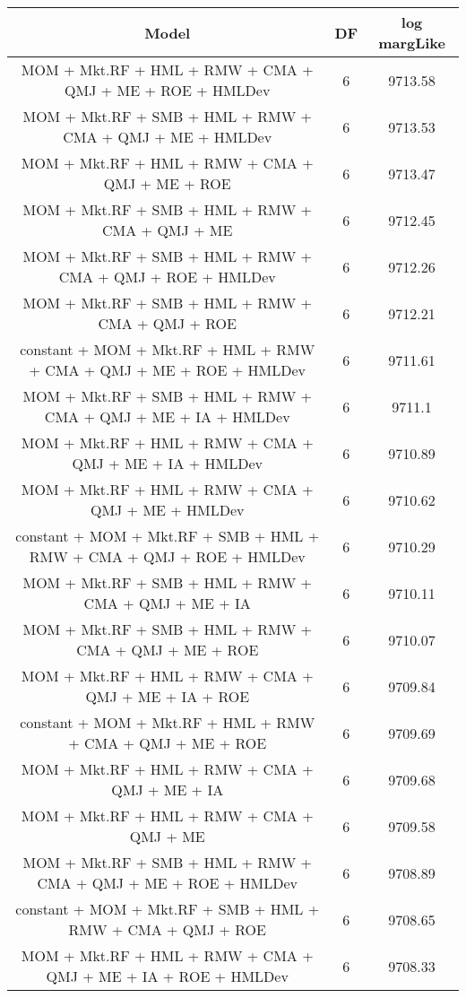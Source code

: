 \begin{tabular}{ccc}
  \hline
Model & DF & log margLike \\ 
  \hline
MOM + Mkt.RF + HML + RMW + CMA + QMJ + ME + ROE + HMLDev & 6 & 9713.58 \\ 
  MOM + Mkt.RF + SMB + HML + RMW + CMA + QMJ + ME + HMLDev & 6 & 9713.53 \\ 
  MOM + Mkt.RF + HML + RMW + CMA + QMJ + ME + ROE & 6 & 9713.47 \\ 
  MOM + Mkt.RF + SMB + HML + RMW + CMA + QMJ + ME & 6 & 9712.45 \\ 
  MOM + Mkt.RF + SMB + HML + RMW + CMA + QMJ + ROE + HMLDev & 6 & 9712.26 \\ 
  MOM + Mkt.RF + SMB + HML + RMW + CMA + QMJ + ROE & 6 & 9712.21 \\ 
  constant + MOM + Mkt.RF + HML + RMW + CMA + QMJ + ME + ROE + HMLDev & 6 & 9711.61 \\ 
  MOM + Mkt.RF + SMB + HML + RMW + CMA + QMJ + ME + IA + HMLDev & 6 & 9711.1 \\ 
  MOM + Mkt.RF + HML + RMW + CMA + QMJ + ME + IA + HMLDev & 6 & 9710.89 \\ 
  MOM + Mkt.RF + HML + RMW + CMA + QMJ + ME + HMLDev & 6 & 9710.62 \\ 
  constant + MOM + Mkt.RF + SMB + HML + RMW + CMA + QMJ + ROE + HMLDev & 6 & 9710.29 \\ 
  MOM + Mkt.RF + SMB + HML + RMW + CMA + QMJ + ME + IA & 6 & 9710.11 \\ 
  MOM + Mkt.RF + SMB + HML + RMW + CMA + QMJ + ME + ROE & 6 & 9710.07 \\ 
  MOM + Mkt.RF + HML + RMW + CMA + QMJ + ME + IA + ROE & 6 & 9709.84 \\ 
  constant + MOM + Mkt.RF + HML + RMW + CMA + QMJ + ME + ROE & 6 & 9709.69 \\ 
  MOM + Mkt.RF + HML + RMW + CMA + QMJ + ME + IA & 6 & 9709.68 \\ 
  MOM + Mkt.RF + HML + RMW + CMA + QMJ + ME & 6 & 9709.58 \\ 
  MOM + Mkt.RF + SMB + HML + RMW + CMA + QMJ + ME + ROE + HMLDev & 6 & 9708.89 \\ 
  constant + MOM + Mkt.RF + SMB + HML + RMW + CMA + QMJ + ROE & 6 & 9708.65 \\ 
  MOM + Mkt.RF + HML + RMW + CMA + QMJ + ME + IA + ROE + HMLDev & 6 & 9708.33 \\ 
   \hline
\end{tabular}
